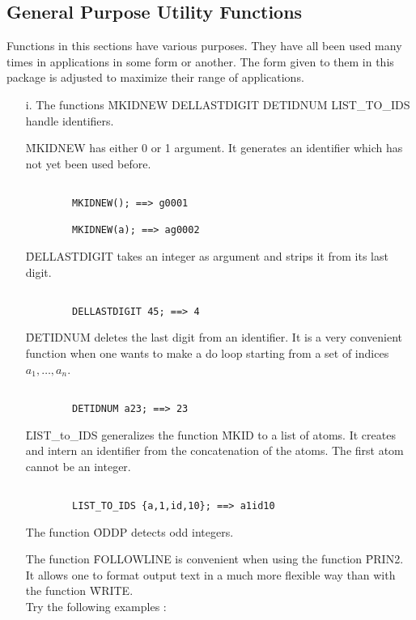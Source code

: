 \subsection{General Purpose Utility Functions}
Functions in this sections have various purposes. They have all been used
many times in applications in some form or another. The form given
to them in this package is adjusted to maximize their range of applications.
\begin{itemize}
\item[i.]
The functions \f{MKIDNEW DELLASTDIGIT DETIDNUM LIST\_TO\_IDS}
handle identifiers. 

\f{MKIDNEW} has either 0 or 1 argument. 
It generates an identifier which has not yet been used before.
\begin{verbatim}

        MKIDNEW(); ==> g0001

        MKIDNEW(a); ==> ag0002

\end{verbatim}
\f{DELLASTDIGIT} takes an integer as argument and strips it from its last
digit.
\begin{verbatim}

        DELLASTDIGIT 45; ==> 4

\end{verbatim}
\f{DETIDNUM} deletes the last digit from an
identifier. It is a very convenient function when one wants to make a do
loop starting from a set of indices $ a_1, \ldots , a_{n} $.
\begin{verbatim}

        DETIDNUM a23; ==> 23

\end{verbatim}

\f{LIST\_to\_IDS} generalizes the function \f{MKID} to a list of
atoms. It creates and intern an identifier from the concatenation of
the atoms. The first atom cannot be an integer.
\begin{verbatim}

        LIST_TO_IDS {a,1,id,10}; ==> a1id10

\end{verbatim}
The function \f{ODDP}  detects odd integers.

The function \f{FOLLOWLINE} is convenient when using the function \f{PRIN2}.
It allows one to format output text in a much more flexible way than with
the function \f{WRITE}. \\
Try the following examples :
\begin{verbatim}


\end{verbatim}
\end{itemize}
